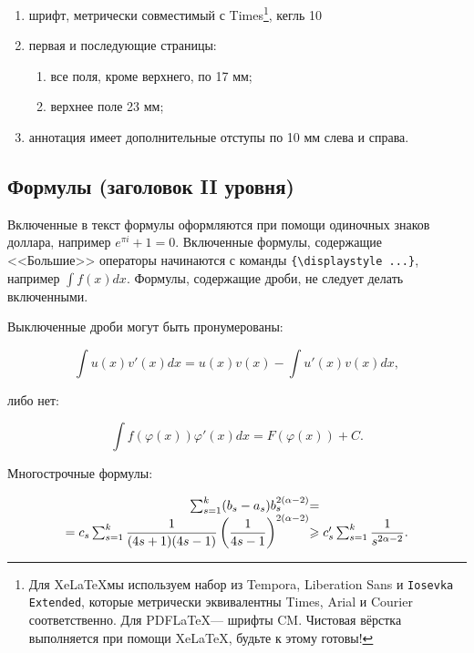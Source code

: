 \documentclass{math-mech-sci}
\begin{document}
\begin{enumerate}
    \item
          шрифт, метрически совместимый с Times\footnote{Для \ifxetex \XeLaTeX \else Xe\LaTeX \fi мы используем набор из Tempora, \textsf{Liberation Sans} и \texttt{Iosevka Extended}, которые метрически эквивалентны Times, Arial и Courier соответственно. Для PDF\LaTeX --- шрифты CM.  Чистовая вёрстка
              выполняется при помощи \ifxetex \XeLaTeX \else Xe\LaTeX \fi, будьте к этому готовы!}, кегль 10
    \item
          первая и последующие страницы:

          \begin{enumerate}
              \item
                    все поля, кроме верхнего, по 17 мм;
              \item
                    верхнее поле 23 мм;
          \end{enumerate}
    \item
          аннотация имеет дополнительные отступы по 10 мм слева и справа.
\end{enumerate}

\subsection*{Формулы (заголовок II уровня)}

Включенные в текст формулы оформляются при помощи одиночных знаков доллара, например $e^{\pi i} + 1 = 0$.
Включенные формулы, содержащие <<Большие>> операторы начинаются с команды \verb"{\displaystyle ...}", например ${\displaystyle\int f(x)dx}$. Формулы, содержащие дроби, не следует делать включенными.

Выключенные дроби могут быть пронумерованы:

\begin{equation}
    \label{eq:exp1}
    \int u(x)v'(x)dx=u(x)v(x)-\int u'(x)v(x)dx,
\end{equation}

либо нет:

\begin{equation*}
    \int f(\varphi(x))\varphi'(x)dx=F(\varphi(x))+C.
\end{equation*}

Многострочные формулы:

\begin{equation}\label{eq:exp2}
    \begin{array}{r@{}l}
        \sum^{k}_{s=1}(b_s-a_s)b^{2(\alpha-2)}_s & =                                                                 \\
        =c_s\sum^{k}_{s=1}\displaystyle\frac{1}{(4s+1)(4s-1)}\left(\displaystyle\frac{1}{4s-1}\right)^{2(\alpha-2)}
                                                 & \geqslant c'_s\sum^{k}_{s=1}\displaystyle\frac{1}{s^{2\alpha-2}}.
    \end{array}
\end{equation}
\end{document}
